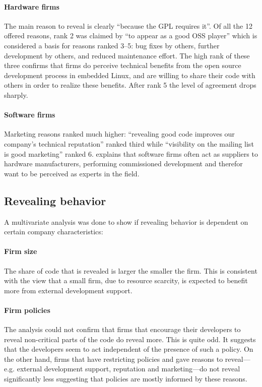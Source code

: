 \documentclass[a4paper]{scrartcl}
\begin{document}
\paragraph{Hardware firms}
The main reason to reveal is clearly ``because the GPL requires it''.
Of all the 12 offered reasons, rank 2 was claimed by ``to appear as a good OSS player'' which is considered a basis for reasons ranked 3--5:  bug fixes by others, further development by others, and reduced maintenance effort.
The high rank of these three confirms that firms do perceive technical benefits from the open source development process in embedded Linux, and are willing to share their code with others in order to realize these benefits.
After rank 5 the level of agreement drops sharply.

\paragraph{Software firms}
Marketing reasons ranked much higher: ``revealing good code improves our company’s technical reputation'' ranked third while ``visibility on the mailing list is good marketing'' ranked 6.
\citeauthor{henkel2006selective} explains that software firms often act as suppliers to hardware manufacturers, performing commissioned development and therefor want to be perceived as experts in the field.

\subsection{Revealing behavior}
A multivariate analysis was done to show if revealing behavior is dependent on certain company characteristics:

\paragraph{Firm size}
The share of code that is revealed is larger the smaller the firm.
This is consistent with the view that a small firm, due to resource scarcity, is expected to benefit more from external development support.

\paragraph{Firm policies}
The analysis could not confirm that firms that encourage their developers to reveal non-critical parts of the code do reveal more.
This is quite odd. 
It suggests that the developers seem to act independent of the presence of such a policy.
On the other hand, firms that have restricting policies and gave reasons to reveal---e.g. external development support, reputation and marketing---do not reveal significantly less suggesting that policies are mostly informed by these reasons.
\end{document}
